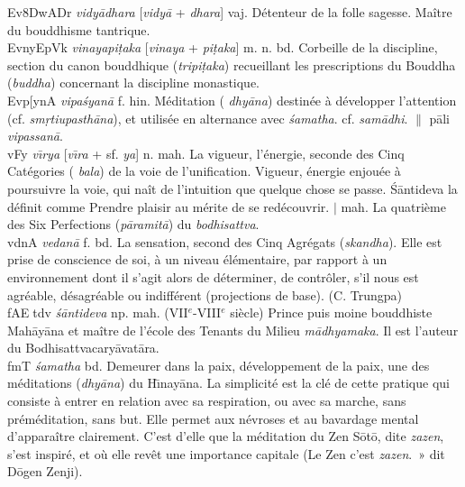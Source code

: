 \documentclass[a4paper,11pt,twocolumn]{article}
\begin{document}
{\dn Ev\38DwADr} {\em vidy\={a}dhara} [{\em vidy\={a}} + {\em dhara}]
vaj. \og Détenteur de la folle sagesse\fg. Maître du bouddhisme tantrique. \\

{\dn EvnyEpVk} {\em vinayapi\d{t}aka} [{\em vinaya} + {\em
pi\d{t}aka}] m. n. bd. \og Corbeille de la discipline\fg, section du
canon bouddhique ({\em tripi\d{t}aka}) recueillant les prescriptions
du Bouddha ({\em buddha}) concernant la discipline monastique. \\

{\dn Evp[ynA} {\em vipa\'{s}yan\={a}} f. hin. Méditation ({\em
dhy\={a}na}) destinée à développer l'attention (cf. {\em
sm\d{r}tiupasth\={a}na}), et utilisée en alternance avec {\em
\'{s}amatha}. cf. {\em sam\={a}dhi}. $\|$ p\={a}li {\em
vipassan\={a}}. \\

{\dn vFy\0} {\em v\={\i}rya} [{\em v\={\i}ra} + sf. {\em ya}]
n. mah. \og La vigueur, l'énergie\fg, seconde des Cinq Catégories ({\em
bala}) de la voie de l'unification. Vigueur, énergie enjouée à
poursuivre la voie, qui naît de l'intuition que \og quelque chose se
passe\fg. \'{S}\={a}ntideva la définit comme \og Prendre plaisir au
mérite de se redécouvrir\fg. $\mid$ mah. La quatrième des Six
Perfections ({\em p\={a}ramit\={a}}) du {\em bodhisattva}. \\

{\dn v\?dnA} {\em vedan\={a}} f. bd. \og La sensation\fg, second des Cinq
Agrégats ({\em skandha}). Elle est prise de conscience de soi, à un
niveau élémentaire, par rapport à un environnement dont il s'agit
alors de déterminer, de contr\^oler, s'il nous est agréable,
désagréable ou indifférent (projections de base). (C. Trungpa) \\

{\dn fAE^^Ftd\?v} {\em \'{s}\={a}ntideva}  np. mah. (VII$^e$-VIII$^e$
siècle) Prince puis moine bouddhiste Mah\={a}y\={a}na et maître de
l'école des Tenants du Milieu {\em m\={a}dhyamaka}. Il est l'auteur du
Bodhisattvacary\={a}vat\={a}ra. \\

{\dn fmT} {\em \'{s}amatha} bd. \og Demeurer dans la paix,
développement de la paix\fg, une des méditations ({\em dhy\={a}na}) du
H\={\i}nay\={a}na. La simplicité est la clé de cette pratique qui
consiste à entrer en relation avec sa respiration, ou avec sa marche,
sans préméditation, sans but. Elle permet aux névroses et au bavardage
mental d'apparaître clairement. C'est d'elle que la méditation du Zen
S\={o}t\={o}, dite {\em zazen}, s'est inspiré, et où elle revêt une
importance capitale (\og Le Zen c'est {\em zazen}.~» dit D\={o}gen
Zenji). \\
\end{document}
